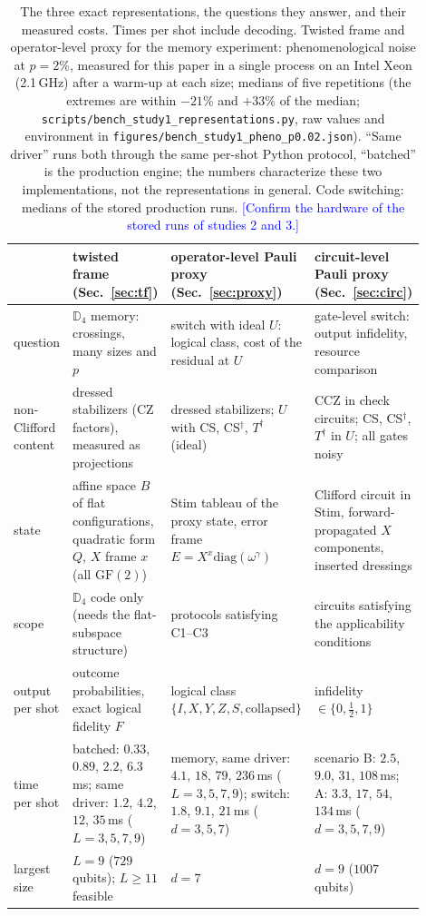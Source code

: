 \documentclass[a4paper]{article}
\newcommand{\blue}[1]{\textcolor{blue}{#1}}
\newcommand{\GF}{\mathrm{GF}(2)}
\begin{document}
\begin{table}[t]
\centering
\caption{The three exact representations, the questions they answer, and their measured costs. Times per shot include decoding. Twisted frame and operator-level proxy for the memory experiment: phenomenological noise at $p=2\%$, measured for this paper in a single process on an Intel Xeon (2.1\,GHz) after a warm-up at each size; medians of five repetitions (the extremes are within $-21\%$ and $+33\%$ of the median; \texttt{scripts/bench\_study1\_representations.py}, raw values and environment in \texttt{figures/bench\_study1\_pheno\_p0.02.json}). ``Same driver'' runs both through the same per-shot Python protocol, ``batched'' is the production engine; the numbers characterize these two implementations, not the representations in general. Code switching: medians of the stored production runs. \blue{[Confirm the hardware of the stored runs of studies 2 and 3.]}}
\label{tab:methods}
\small
\renewcommand{\arraystretch}{1.15}
\begin{tabular}{p{0.15\linewidth}p{0.25\linewidth}p{0.25\linewidth}p{0.25\linewidth}}
\toprule
 & twisted frame (Sec.~\ref{sec:tf}) & operator-level Pauli proxy (Sec.~\ref{sec:proxy}) & circuit-level Pauli proxy (Sec.~\ref{sec:circ}) \\
\midrule
question & $\mathbb{D}_4$ memory: crossings, many sizes and $p$ & switch with ideal $U$: logical class, cost of the residual at $U$ & gate-level switch: output infidelity, resource comparison \\
non-Clifford content & dressed stabilizers (CZ factors), measured as projections & dressed stabilizers; $U$ with CS, CS$^\dagger$, $T^\dagger$ (ideal) & CCZ in check circuits; CS, CS$^\dagger$, $T^\dagger$ in $U$; all gates noisy \\
state & affine space $B$ of flat configurations, quadratic form $Q$, $X$ frame $x$ (all $\GF$) & Stim tableau of the proxy state, error frame $E=X^x\mathrm{diag}(\omega^\gamma)$ & Clifford circuit in Stim, forward-propagated $X$ components, inserted dressings \\
scope & $\mathbb{D}_4$ code only (needs the flat-subspace structure) & protocols satisfying C1--C3 & circuits satisfying the applicability conditions \\
output per shot & outcome probabilities, exact logical fidelity $F$ & logical class $\{I,X,Y,Z,S,\text{collapsed}\}$ & infidelity $\in\{0,\tfrac12,1\}$ \\
time per shot & batched: $0.33$, $0.89$, $2.2$, $6.3$\,ms; same driver: $1.2$, $4.2$, $12$, $35$\,ms ($L=3,5,7,9$) & memory, same driver: $4.1$, $18$, $79$, $236$\,ms ($L=3,5,7,9$); switch: $1.8$, $9.1$, $21$\,ms ($d=3,5,7$) & scenario B: $2.5$, $9.0$, $31$, $108$\,ms; A: $3.3$, $17$, $54$, $134$\,ms ($d=3,5,7,9$) \\
largest size & $L=9$ ($729$ qubits); $L\ge11$ feasible & $d=7$ & $d=9$ ($1007$ qubits) \\
\bottomrule
\end{tabular}
\end{table}
\end{document}
